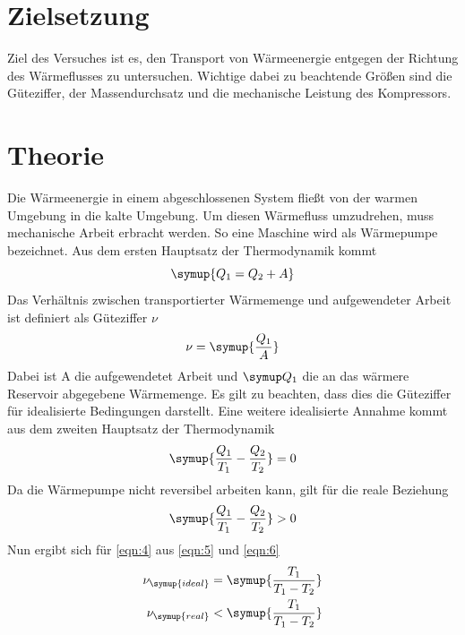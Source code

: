 \maketitle
\tableofcontents
\newpage

\section{Zielsetzung}
Ziel des Versuches ist es, den Transport von Wärmeenergie entgegen der Richtung des Wärmeflusses
zu untersuchen. Wichtige dabei zu beachtende Größen sind die Güteziffer, der Massendurchsatz und
die mechanische Leistung des Kompressors.
\section{Theorie}
Die Wärmeenergie in einem abgeschlossenen System fließt von der warmen Umgebung in die kalte
Umgebung. Um diesen Wärmefluss umzudrehen, muss mechanische Arbeit erbracht werden. So
eine Maschine wird als Wärmepumpe bezeichnet. Aus dem ersten Hauptsatz der Thermodynamik kommt
\begin{equation}
    \symup{Q_1 = Q_2 + A}
    \label{eqn:3}
\end{equation}
Das Verhältnis zwischen transportierter Wärmemenge und aufgewendeter Arbeit ist definiert
als Güteziffer $\nu$
\begin{equation}
    \nu = \symup{\frac{Q_1}{A}}
    \label{eqn:4}
\end{equation}
Dabei ist A die aufgewendetet Arbeit und $\symup Q_1$ die an das wärmere Reservoir abgegebene
Wärmemenge. Es gilt zu beachten, dass dies die Güteziffer für idealisierte Bedingungen darstellt.
Eine weitere idealisierte Annahme kommt aus dem zweiten Hauptsatz der Thermodynamik
\begin{equation}
    \symup{\frac{Q_1}{T_1} - \frac{Q_2}{T_2}} = 0
    \label{eqn:5}
\end{equation}
Da die Wärmepumpe nicht reversibel arbeiten kann, gilt für die reale Beziehung
\begin{equation}
  \symup{\frac{Q_1}{T_1} - \frac{Q_2}{T_2}} > 0
  \label{eqn:6}
\end{equation}
Nun ergibt sich für \eqref{eqn:4} aus \eqref{eqn:5} und \eqref{eqn:6}
\begin{equation}
  \begin{split}
    \nu_{\symup{ideal}} = \symup{\frac{T_1}{T_1 - T_2}} \\
    \nu_{\symup{real}} < \symup{\frac{T_1}{T_1 - T_2}}
    \label{eqn:7}
  \end{split}
\end{equation}
